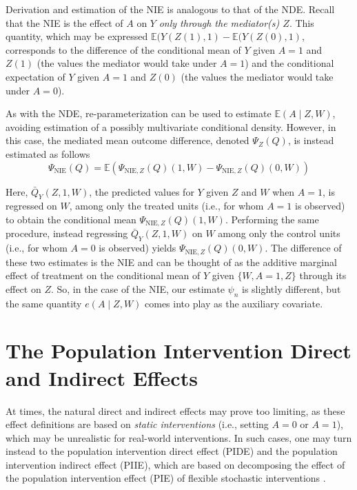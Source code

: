 \documentclass[
  12pt, krantz2,
]{krantz}
\newcommand{\E}{\mathbb{E}}
\newcommand{\1}{\mathbbm{1}}
\theoremstyle{definition}
\theoremstyle{definition}
\theoremstyle{definition}
\theoremstyle{definition}
\theoremstyle{remark}
\begin{document}
Derivation and estimation of the NIE is analogous to that of the NDE. Recall
that the NIE is the effect of \(A\) on \(Y\) \emph{only through the mediator(s) \(Z\)}.
This quantity, which may be expressed \(\E(Y(Z(1), 1) - \E(Y(Z(0), 1)\),
corresponds to the difference of the conditional mean of \(Y\) given \(A = 1\) and
\(Z(1)\) (the values the mediator would take under \(A = 1\)) and the conditional
expectation of \(Y\) given \(A = 1\) and \(Z(0)\) (the values the mediator would take
under \(A = 0\)).

As with the NDE, re-parameterization can be used to estimate \(\E(A \mid Z, W)\), avoiding estimation of a possibly multivariate conditional density.
However, in this case, the mediated mean outcome difference, denoted
\(\Psi_Z(Q)\), is instead estimated as follows
\begin{equation*}
  \Psi_{\text{NIE}}(Q) = \E (\Psi_{\text{NIE}, Z}(Q)(1, W) -
  \Psi_{\text{NIE}, Z}(Q)(0, W))
\end{equation*}

Here, \(\bar{Q}_Y(Z, 1, W)\), the predicted values for \(Y\) given \(Z\) and \(W\) when
\(A = 1\), is regressed on \(W\), among only the treated units (i.e., for whom \(A = 1\) is observed) to obtain the conditional mean \(\Psi_{\text{NIE}, Z}(Q)(1, W)\).
Performing the same procedure, instead regressing \(\bar{Q}_Y(Z, 1, W)\) on \(W\)
among only the control units (i.e., for whom \(A = 0\) is observed) yields
\(\Psi_{\text{NIE},Z}(Q)(0, W)\). The difference of these two estimates is the NIE
and can be thought of as the additive marginal effect of treatment on the
conditional mean of \(Y\) given \(\{W, A = 1, Z\}\) through its effect on \(Z\). So,
in the case of the NIE, our estimate \(\psi_n\) is slightly different, but the
same quantity \(e(A \mid Z, W)\) comes into play as the auxiliary covariate.

\hypertarget{the-population-intervention-direct-and-indirect-effects}{%
\section{The Population Intervention Direct and Indirect Effects}\label{the-population-intervention-direct-and-indirect-effects}}

At times, the natural direct and indirect effects may prove too limiting, as
these effect definitions are based on \emph{static interventions} (i.e., setting
\(A = 0\) or \(A = 1\)), which may be unrealistic for real-world interventions. In
such cases, one may turn instead to the population intervention direct effect
(PIDE) and the population intervention indirect effect (PIIE), which are based
on decomposing the effect of the population intervention effect (PIE) of
flexible stochastic interventions \citep{diaz2020causal}.
\end{document}

